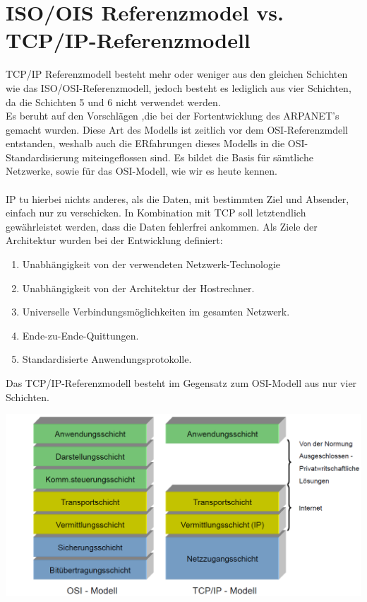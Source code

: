 \documentclass[11pt]{article}
\begin{document}
    \section{ISO/OIS Referenzmodel vs. TCP/IP-Referenzmodell}
    TCP/IP Referenzmodell besteht mehr oder weniger aus den gleichen Schichten
    wie das ISO/OSI-Referenzmodell, jedoch besteht es lediglich aus vier Schichten,
    da die Schichten 5 und 6 nicht verwendet werden.\\
    Es beruht auf den Vorschlägen ,die bei der Fortentwicklung des ARPANET's
    gemacht wurden.
    Diese Art des Modells ist zeitlich vor dem OSI-Referenzmdell entstanden, weshalb
    auch die ERfahrungen dieses Modells in die OSI-Standardisierung miteingeflossen sind.
    Es bildet die Basis für sämtliche Netzwerke, sowie für das OSI-Modell, wie wir es heute
    kennen. \\\\
    IP tu hierbei nichts anderes, als die Daten, mit bestimmten Ziel und Absender, einfach
    nur zu verschicken. In Kombination mit TCP soll letztendlich gewährleistet werden,
    dass die Daten fehlerfrei ankommen.
    Als Ziele der Architektur wurden bei der Entwicklung definiert:
    \begin{enumerate}

        \item{Unabhängigkeit von der verwendeten Netzwerk-Technologie}

        \item{Unabhängigkeit von der Architektur der Hostrechner. }

        \item{Universelle Verbindungsmöglichkeiten im gesamten Netzwerk. }

        \item{Ende-zu-Ende-Quittungen. }

        \item{Standardisierte Anwendungsprotokolle.}

    \end{enumerate}



    Das TCP/IP-Referenzmodell besteht im Gegensatz zum OSI-Modell aus nur vier Schichten.

    \includegraphics[width = \textwidth]{tcp_ip_model.png}
\end{document}
